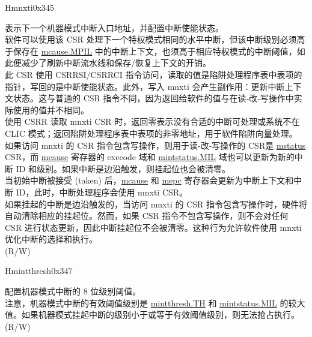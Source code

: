 \begin{register}{H}{mnxti}{0x345}\label{regdesc:MNXTI_REG}
%
\regnewline%
\begin{regdesc}\begin{reglist}
\label{fielddesc:MNXTI}\item [MNXTI]
表示下一个机器模式中断入口地址，并配置中断使能状态。\\
软件可以使用该 CSR 处理下一个特权模式相同的水平中断，但该中断级别必须高于保存在 \hyperref[fielddesc:MCAUSE_MPIL]{{mcause.MPIL}} 中的中断上下文，也须高于相应特权模式的中断阈值，如此便减少了刷新中断流水线和保存/恢复上下文的开销。\\
此 CSR 使用 CSRRSI/CSRRCI 指令访问，读取的值是陷阱处理程序表中表项的指针，写回的是中断使能状态。此外，写入 mnxti 会产生副作用：更新中断上下文状态。这与普通的 CSR 指令不同，因为返回给软件的值与在读‑改‑写操作中实际使用的值并不相同。\\
使用 CSRR 读取 mnxti CSR 时，返回零表示没有合适的中断可处理或系统不在 CLIC 模式；返回陷阱处理程序表中表项的非零地址，用于软件陷阱向量处理。\\
如果访问 mnxti 的 CSR 指令包含写操作，则用于读-改-写操作的 CSR是 \hyperref[regdesc:MSTATUS]{mstatus} CSR，而 \hyperref[regdesc:MCAUSE]{mcause} 寄存器的 exccode 域和 \hyperref[fielddesc:MINTSTATUS_MIL]{mintstatus.MIL} 域也可以更新为新的中断 ID 和级别。如果中断是边沿触发，则挂起位也会被清零。\\
当初始中断被接受 (taken) 后，\hyperref[regdesc:MCAUSE]{mcause} 和 \hyperref[regdesc:MEPC]{mepc} 寄存器会更新为中断上下文和中断 ID，此时，中断处理程序会使用 mnxti CSR。\\
如果挂起的中断是边沿触发的，当访问 mnxti 的 CSR 指令包含写操作时，硬件将自动清除相应的挂起位。然而，如果 CSR 指令不包含写操作，则不会对任何 CSR 进行状态更新，因此中断挂起位不会被清零。这种行为允许软件使用 mnxti 优化中断的选择和执行。\\
(R/W)
\end{reglist}\end{regdesc}
\end{register}

\begin{register}{H}{mintthresh}{0x347}\label{regdesc:MINTTHRESH}
%
%
\regnewline%
\begin{regdesc}\begin{reglist}
\label{fielddesc:MINTTHRESH_TH}\item [TH] 配置机器模式中断的 8 位级别阈值。 \\
注意，机器模式中断的有效阈值级别是 \hyperref[fielddesc:MINTTHRESH_TH]{{mintthresh.TH}} 和 \hyperref[fielddesc:MINTSTATUS_MIL]{{mintstatus.MIL}} 的较大值。如果机器模式挂起中断的级别小于或等于有效阈值级别，则无法抢占执行。\\
(R/W)
\end{reglist}\end{regdesc}
\end{register}


